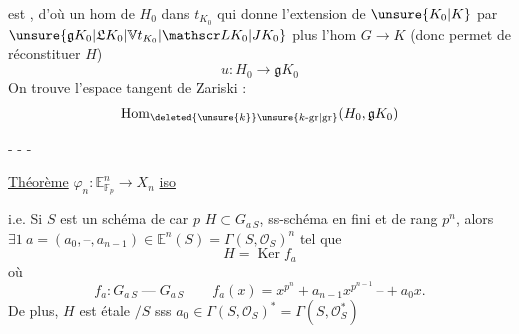 est , d'où un hom  de $H_0$ dans $t_{K_0}$ qui donne l'extension de $\unsure{K_0|K}$ par $\unsure{\mathfrak g K_0|\mathfrak L K_0|\mathbb V t_{K_0}|\mathscr L K_0|J K_0}$ plus l'hom $G\longrightarrow K$  (donc permet de réconstituer $H$)
\[ u:H_0\longrightarrow\mathfrak g K_0 \]
On trouve l'espace tangent de Zariski :
\[ \operatorname{Hom}_{\deleted{\unsure{k}}\unsure{k\text{-gr}|\text{gr}}}(H_0,\mathfrak g K_0) \]
\begin{center}- - -\end{center}

\uline{Théorème} $\varphi_n:\mathbb E^n_{\mathbb F_p}\longrightarrow X_n$ \uline{iso}

i.e. Si $S$ est un schéma de car $p$ $H\subset G_{a\,S}$, ss-schéma en  fini et   de rang $p^n$, alors $\exists1\ a=(a_0,\text{--},a_{n-1})\in\mathbb E^n(S)=\Gamma(S,\mathscr O_S)^n$ tel que
\[ H=\operatorname{Ker} f_a \]
où
\[ f_a:G_{a\,S}\mathbin{\text{---}}G_{a\,S}\qquad f_a(x)=x^{p^n}+a_{n-1}x^{p^{n-1}}\ \text{--}+a_0x . \]
De plus, $H$ est étale $/S$ sss $a_0\in\Gamma(S,\mathscr O_S)^*=\Gamma(S,\mathscr O_S^*)$
